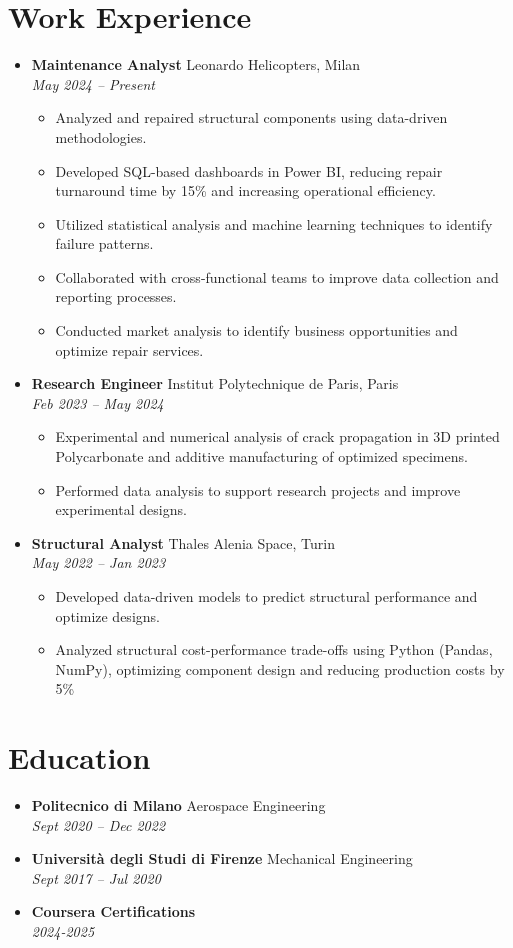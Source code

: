\documentclass[letterpaper,10.5pt]{article}
\newcommand{\resumeEntry}[4]{
  \item\textbf{#1} \hfill #2\\
  \textit{#3} \hfill \textit{#4}
}
\newcommand{\resumeDescription}[1]{
  \vspace{-4pt}\begin{itemize}[leftmargin=0.2in]
    #1
  \end{itemize}
}
\begin{document}
\section*{Work Experience}
\begin{itemize}[leftmargin=0.2in]
    \resumeEntry{Maintenance Analyst}{Leonardo Helicopters, Milan}{May 2024 -- Present}{}
    \resumeDescription{
        \item Analyzed and repaired structural components using data-driven methodologies.
        \item Developed SQL-based dashboards in Power BI, reducing repair turnaround time by 15\% and increasing operational efficiency.
        \item Utilized statistical analysis and machine learning techniques to identify failure patterns.
        \item Collaborated with cross-functional teams to improve data collection and reporting processes.
        \item Conducted market analysis to identify business opportunities and optimize repair services.
    }
    \resumeEntry{Research Engineer}{Institut Polytechnique de Paris, Paris}{Feb 2023 -- May 2024}{}
    \resumeDescription{
        \item Experimental and numerical analysis of crack propagation in 3D printed Polycarbonate and additive manufacturing of optimized specimens.
        \item Performed data analysis to support research projects and improve experimental designs.
    }
    \resumeEntry{Structural Analyst}{Thales Alenia Space, Turin}{May 2022 -- Jan 2023}{}
    \resumeDescription{
        \item Developed data-driven models to predict structural performance and optimize designs.
        \item Analyzed structural cost-performance trade-offs using Python (Pandas, NumPy), optimizing component design and reducing production costs by 5\%
    }
\end{itemize}

\section*{Education}
\begin{itemize}[leftmargin=0.2in]
    \resumeEntry{Politecnico di Milano}{Aerospace Engineering}{Sept 2020 -- Dec 2022}{}
    \resumeEntry{Università degli Studi di Firenze}{Mechanical Engineering}{Sept 2017 -- Jul 2020}{}
    \resumeEntry{Coursera Certifications}{}{2024-2025}{}
\end{itemize}
\end{document}
